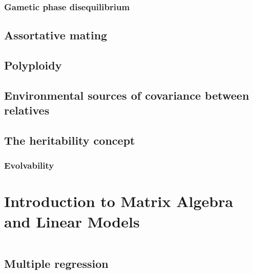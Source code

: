 \documentclass[
]{book}
\begin{document}
\hypertarget{gametic-phase-disequilibrium}{%
\subsection{Gametic phase disequilibrium}\label{gametic-phase-disequilibrium}}

\hypertarget{assortative-mating}{%
\section{Assortative mating}\label{assortative-mating}}

\hypertarget{polyploidy-1}{%
\section{Polyploidy}\label{polyploidy-1}}

\hypertarget{environmental-sources-of-covariance-between-relatives}{%
\section{Environmental sources of covariance between relatives}\label{environmental-sources-of-covariance-between-relatives}}

\hypertarget{the-heritability-concept}{%
\section{The heritability concept}\label{the-heritability-concept}}

\hypertarget{evolvability}{%
\subsection{Evolvability}\label{evolvability}}

\hypertarget{introduction-to-matrix-algebra-and-linear-models}{%
\chapter{Introduction to Matrix Algebra and Linear Models}\label{introduction-to-matrix-algebra-and-linear-models}}

\[\newcommand{\mx}[1]{\mathbf{#1}}\]

\hypertarget{multiple-regression}{%
\section{Multiple regression}\label{multiple-regression}}
\end{document}
